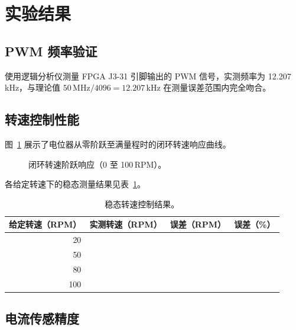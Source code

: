 \documentclass[12pt, a4paper]{ctexrep}
\begin{document}
\section{实验结果}

\subsection{PWM 频率验证}

使用逻辑分析仪测量 FPGA J3-31 引脚输出的 PWM 信号，实测频率为 12.207\,kHz，与理论值 $50\,\text{MHz}/4096 = 12.207\,\text{kHz}$ 在测量误差范围内完全吻合。

\subsection{转速控制性能}

图~\ref{fig:speed_response} 展示了电位器从零阶跃至满量程时的闭环转速响应曲线。

\begin{figure}[H]
    \centering
    \caption{闭环转速阶跃响应（0 至 100\,RPM）。}
    \label{fig:speed_response}
\end{figure}

各给定转速下的稳态测量结果见表~\ref{tab:speed_results}。

\begin{table}[H]
    \centering
    \caption{稳态转速控制结果。}
    \label{tab:speed_results}
    \begin{tabular}{rrrr}
        \toprule
        \textbf{给定转速（RPM）} & \textbf{实测转速（RPM）} &
        \textbf{误差（RPM）} & \textbf{误差（\%）} \\
        \midrule
        20  & %
            & & \\
        50  & & & \\
        80  & & & \\
        100 & & & \\
        \bottomrule
    \end{tabular}
\end{table}

\subsection{电流传感精度}
\end{document}
